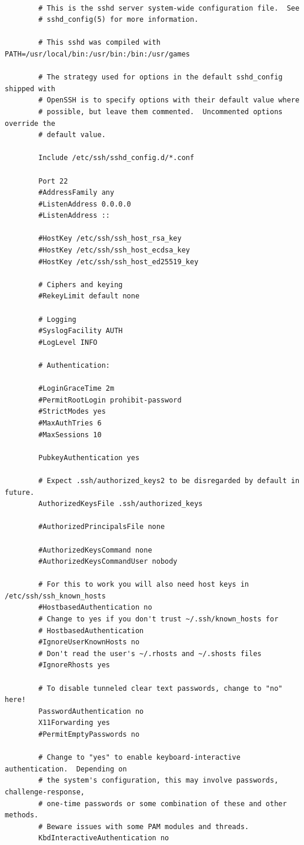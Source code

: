\documentclass[14pt, a4paper]{extreport}
\begin{document}
	\begin{verbatim} 
		
		# This is the sshd server system-wide configuration file.  See
		# sshd_config(5) for more information.
		
		# This sshd was compiled with PATH=/usr/local/bin:/usr/bin:/bin:/usr/games
		
		# The strategy used for options in the default sshd_config shipped with
		# OpenSSH is to specify options with their default value where
		# possible, but leave them commented.  Uncommented options override the
		# default value.
		
		Include /etc/ssh/sshd_config.d/*.conf
		
		Port 22
		#AddressFamily any
		#ListenAddress 0.0.0.0
		#ListenAddress ::
		
		#HostKey /etc/ssh/ssh_host_rsa_key
		#HostKey /etc/ssh/ssh_host_ecdsa_key
		#HostKey /etc/ssh/ssh_host_ed25519_key
		
		# Ciphers and keying
		#RekeyLimit default none
		
		# Logging
		#SyslogFacility AUTH
		#LogLevel INFO
		
		# Authentication:
		
		#LoginGraceTime 2m
		#PermitRootLogin prohibit-password
		#StrictModes yes
		#MaxAuthTries 6
		#MaxSessions 10
		
		PubkeyAuthentication yes
		
		# Expect .ssh/authorized_keys2 to be disregarded by default in future.
		AuthorizedKeysFile .ssh/authorized_keys
		
		#AuthorizedPrincipalsFile none
		
		#AuthorizedKeysCommand none
		#AuthorizedKeysCommandUser nobody
		
		# For this to work you will also need host keys in /etc/ssh/ssh_known_hosts
		#HostbasedAuthentication no
		# Change to yes if you don't trust ~/.ssh/known_hosts for
		# HostbasedAuthentication
		#IgnoreUserKnownHosts no
		# Don't read the user's ~/.rhosts and ~/.shosts files
		#IgnoreRhosts yes
		
		# To disable tunneled clear text passwords, change to "no" here!
		PasswordAuthentication no
		X11Forwarding yes
		#PermitEmptyPasswords no
		
		# Change to "yes" to enable keyboard-interactive authentication.  Depending on
		# the system's configuration, this may involve passwords, challenge-response,
		# one-time passwords or some combination of these and other methods.
		# Beware issues with some PAM modules and threads.
		KbdInteractiveAuthentication no
		

\end{verbatim}
\end{document}
